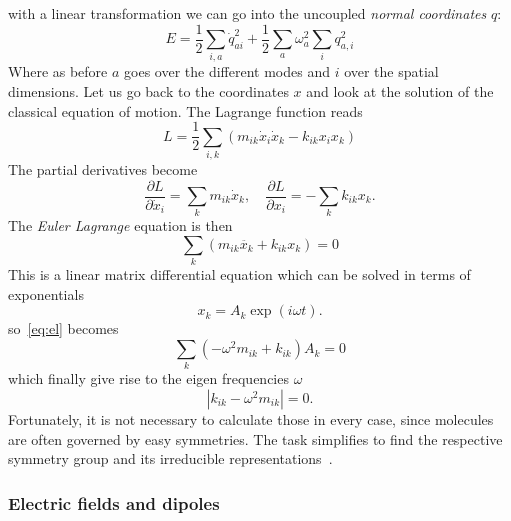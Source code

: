 with a linear transformation we can go into the uncoupled \textit{normal coordinates} $q$:
\begin{equation}
    E = \frac{1}{2} \sum_{i,a} \dot{q}^2_{ai} + \frac{1}{2} \sum_a \omega_a^2 \sum_i q^2_{a,i} 
\end{equation}
Where as before $a$ goes over the different modes and $i$ over the spatial dimensions.
Let us go back to the coordinates $x$ and look at the solution of the classical equation
of motion. The Lagrange function reads
\begin{equation}
    L = \frac{1}{2} \sum_{i,k} (m_{ik} \dot{x}_i\dot{x}_k -  k_{ik} x_i x_k   )
\end{equation}
The partial derivatives become 
\begin{equation}
    \frac{\partial L}{\partial \dot{x}_i} = \sum_k m_{ik} \dot{x}_k , \quad 
    \frac{\partial L}{\partial x_i} = - \sum_k k_{ik} x_k.
\end{equation}
The \textit{Euler Lagrange} equation is then 
\begin{equation}
    \label{eq:el}
    \sum_k (m_{ik} \ddot{x_k} + k_{ik} x_k) = 0 
\end{equation}
This is a linear matrix differential equation which can be solved in terms of exponentials
\begin{equation}
    x_k = A_k \exp(i\omega t).
\end{equation}
so~\eqref{eq:el} becomes 
\begin{equation}
    \sum_k \left( -\omega^2 m_{ik} + k_{ik} \right)A_k = 0
\end{equation}
which finally give rise to the eigen frequencies $\omega$
\begin{equation}
    |k_{ik} - \omega^2 m_{ik}| = 0. 
\end{equation}
Fortunately, it is not necessary to calculate those in every case, since
molecules are often governed by easy symmetries. The task simplifies to
find the respective symmetry group and its irreducible representations~\cite{landau1977quantum}. 


\subsubsection{Electric fields and dipoles}
\label{ssub:Electricfieldsanddipoles}

